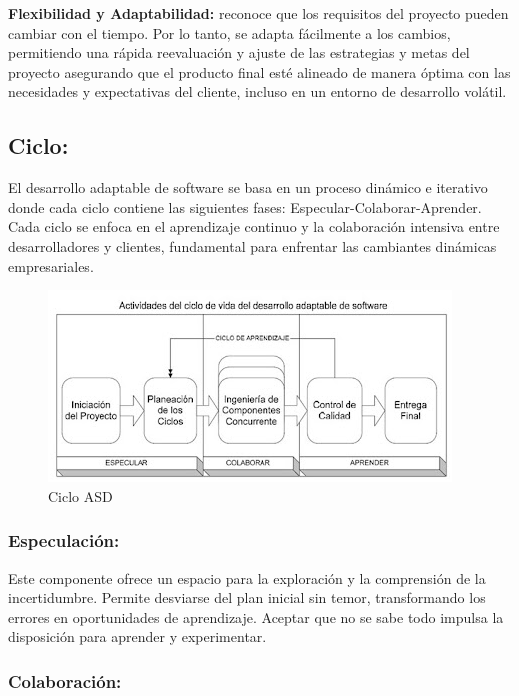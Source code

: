 \documentclass[
  10,
  openany]{book}
\begin{document}
\textbf{Flexibilidad y Adaptabilidad:} reconoce que los requisitos del proyecto pueden cambiar con el tiempo. Por lo tanto, se adapta fácilmente a los cambios, permitiendo una rápida reevaluación y ajuste de las estrategias y metas del proyecto asegurando que el producto final esté alineado de manera óptima con las necesidades y expectativas del cliente, incluso en un entorno de desarrollo volátil.

\hypertarget{ciclo}{%
\subsection{Ciclo:}\label{ciclo}}

El desarrollo adaptable de software se basa en un proceso dinámico e iterativo donde cada ciclo contiene las siguientes fases: Especular-Colaborar-Aprender. Cada ciclo se enfoca en el aprendizaje continuo y la colaboración intensiva entre desarrolladores y clientes, fundamental para enfrentar las cambiantes dinámicas empresariales.

\begin{figure}

{\centering \includegraphics[width=0.6\linewidth]{images/04-metodologia/02_ciclo} 

}

\caption{Ciclo ASD}\label{fig:metdas}
\end{figure}

\hypertarget{especulaciuxf3n}{%
\subsubsection{\texorpdfstring{\textbf{Especulación:}}{Especulación:}}\label{especulaciuxf3n}}

Este componente ofrece un espacio para la exploración y la comprensión de la incertidumbre. Permite desviarse del plan inicial sin temor, transformando los errores en oportunidades de aprendizaje. Aceptar que no se sabe todo impulsa la disposición para aprender y experimentar.

\hypertarget{colaboraciuxf3n}{%
\subsubsection{\texorpdfstring{\textbf{Colaboración:}}{Colaboración:}}\label{colaboraciuxf3n}}
\end{document}
